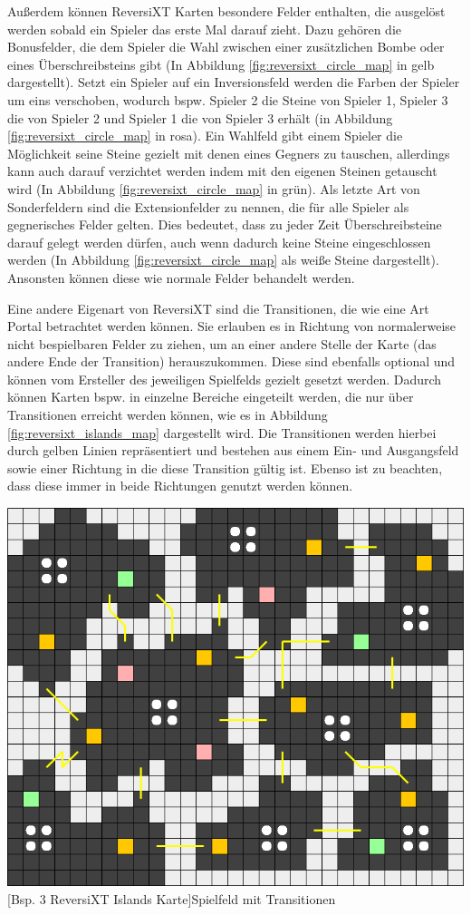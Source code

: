 \documentclass[12pt,a4paper,bibliography=totocnumbered,listof=totocnumbered]{article}
\begin{document}
Außerdem können ReversiXT Karten besondere Felder enthalten, die ausgelöst werden sobald ein Spieler das erste Mal darauf zieht. Dazu gehören die Bonusfelder, die dem Spieler die Wahl zwischen einer zusätzlichen Bombe oder eines Überschreibsteins gibt (In Abbildung \ref{fig:reversixt_circle_map} in gelb dargestellt). Setzt ein Spieler auf ein Inversionsfeld werden die Farben der Spieler um eins verschoben, wodurch bspw. Spieler 2 die Steine von Spieler 1, Spieler 3 die von Spieler 2 und Spieler 1 die von Spieler 3 erhält (in Abbildung \ref{fig:reversixt_circle_map} in rosa). Ein Wahlfeld gibt einem Spieler die Möglichkeit seine Steine gezielt mit denen eines Gegners zu tauschen, allerdings kann auch darauf verzichtet werden indem mit den eigenen Steinen \glqq getauscht\grqq{} wird (In Abbildung \ref{fig:reversixt_circle_map} in grün). Als letzte Art von Sonderfeldern sind die Extensionfelder zu nennen, die für alle Spieler als gegnerisches Felder gelten. Dies bedeutet, dass zu jeder Zeit Überschreibsteine darauf gelegt werden dürfen, auch wenn dadurch keine Steine eingeschlossen werden (In Abbildung \ref{fig:reversixt_circle_map} als weiße Steine dargestellt). Ansonsten können diese wie normale Felder behandelt werden.

Eine andere Eigenart von ReversiXT sind die Transitionen, die wie eine Art Portal betrachtet werden können. Sie erlauben es in Richtung von normalerweise nicht bespielbaren Felder zu ziehen, um an einer andere Stelle der Karte (das andere Ende der Transition) herauszukommen. Diese sind ebenfalls optional und können vom Ersteller des jeweiligen Spielfelds gezielt gesetzt werden. Dadurch können Karten bspw. in einzelne Bereiche eingeteilt werden, die nur über Transitionen erreicht werden können, wie es in Abbildung \ref{fig:reversixt_islands_map} dargestellt wird. Die Transitionen werden hierbei durch gelben Linien repräsentiert und bestehen aus einem Ein- und Ausgangsfeld sowie einer Richtung in die diese Transition gültig ist. Ebenso ist zu beachten, dass diese immer in beide Richtungen genutzt werden können.

\vspace{1em}
\begin{minipage}{\linewidth}
	\centering
	\includegraphics[width=0.7\linewidth]{pics/reversixt_islands_map.png}
	[Bsp. 3 ReversiXT Islands Karte]{Spielfeld mit Transitionen}
	\label{fig:reversixt_islands_map}
\end{minipage}
\\
\end{document}
